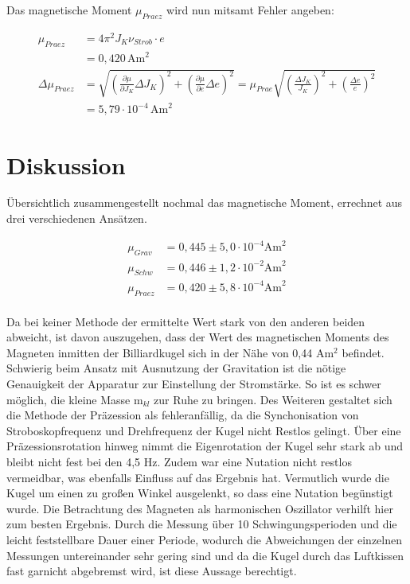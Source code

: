 Das magnetische Moment $\mu_{Praez}$ wird nun mitsamt Fehler angeben:

\begin{align}
 \nonumber
 \mu_{Praez} &= 4\pi^2 J_K \nu_{Strob} \cdot e \\
 &= 0,420\, \text{Am}^2\\
 \nonumber
 \Delta \mu_{Praez} &= \sqrt{\left(\frac{\partial \mu}{\partial J_{K}}\Delta J_{K} \right)^2 + \left(\frac{\partial \mu}{\partial e}\Delta e \right)^2} = \mu_{Prae} \sqrt{\left( \frac{\Delta J_{K}}{J_{K}}\right)^2 + \left( \frac{\Delta e}{e}\right)^2}\\
 &= 5,79 \cdot 10^{-4}\, \text{Am}^2
\end{align}

\section{Diskussion}
Übersichtlich zusammengestellt nochmal das magnetische Moment, errechnet aus drei verschiedenen Ansätzen.

\begin{align*}
 \mu_{Grav} &= 0,445 \pm 5,0 \cdot 10^{-4} \text{Am}^2\\
 \mu_{Schw} &= 0,446 \pm 1,2 \cdot 10^{-2} \text{Am}^2\\
 \mu_{Praez} &= 0,420 \pm 5,8 \cdot 10^{-4} \text{Am}^2\\
\end{align*}

Da bei keiner Methode der ermittelte Wert stark von den anderen beiden abweicht, ist davon auszugehen, dass der Wert des magnetischen 
Moments des Magneten inmitten der Billiardkugel sich in der Nähe von 0,44 Am$^2$ befindet. Schwierig beim Ansatz mit Ausnutzung der
Gravitation ist die nötige Genauigkeit der Apparatur zur Einstellung der Stromstärke. So ist es schwer möglich, die kleine Masse m$_{kl}$
zur Ruhe zu bringen. Des Weiteren gestaltet sich die Methode der Präzession als fehleranfällig, da die Synchonisation von Stroboskopfrequenz
und Drehfrequenz der Kugel nicht Restlos gelingt. Über eine Präzessionsrotation hinweg nimmt die Eigenrotation der Kugel sehr stark ab und bleibt nicht fest bei den 4,5 Hz. Zudem war eine Nutation nicht restlos vermeidbar, was ebenfalls Einfluss auf das Ergebnis hat. 
Vermutlich wurde die Kugel um einen zu großen Winkel ausgelenkt, so dass eine Nutation begünstigt wurde. Die Betrachtung des Magneten als
harmonischen Oszillator verhilft hier zum besten Ergebnis. Durch die Messung über 10 Schwingungsperioden und die leicht feststellbare Dauer
einer Periode, wodurch die Abweichungen der einzelnen Messungen untereinander sehr gering sind und da die Kugel durch das Luftkissen fast garnicht abgebremst wird,
 ist diese Aussage berechtigt.






